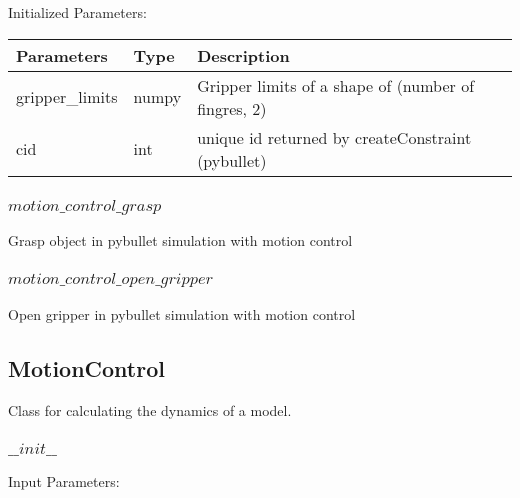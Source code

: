 \documentclass[
	ngerman,
	accentcolor=9c,%
	type=intern,
	marginpar=false
	]{tudapub}
\begin{document}
\noindent Initialized Parameters:


\vspace{0.5cm}
\begin{tabular}{|p{}| p{}| p{}|}
\hline
\textbf{Parameters} & \textbf{Type} & \textbf{Description} \\
\hline
gripper\_limits & numpy & Gripper limits of a shape of (number of fingres, 2) \\
\hline
cid & int & unique id returned by createConstraint (pybullet) \\
\hline
\end{tabular}



\vspace{1cm}


\subsubsection{$motion\_control\_grasp$}
\noindent Grasp object in pybullet simulation with motion control

\vspace{1cm}

\subsubsection{$motion\_control\_open\_gripper$}
\noindent Open gripper in pybullet simulation with motion control

\vspace{1cm}



\subsection{MotionControl}
\noindent Class for calculating the dynamics of a model.

\vspace{0.5cm}
\subsubsection{$\_\_init\_\_$}
\noindent Input Parameters:
\vspace{0.5cm}
\end{document}

